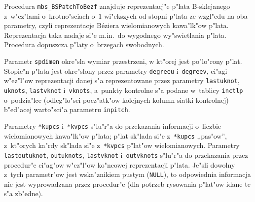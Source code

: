 \vspace{\bigskipamount}
\begin{sloppypar}
Procedura \texttt{mbs\_BSPatchToBezf} znajduje reprezentacj"e
p"lata B-sklejanego z~w"ez\-"la\-mi o~krotno"sciach o~$1$ wi"ekszych od stopni
p"lata ze wzgl"edu na oba parametry, czyli reprezentacje B\'{e}ziera
wielomianowych kawa"lk"ow p"lata. Reprezentacja taka nadaje si"e m.in.\ do
wygodnego wy"swietlania p"lata. Procedura dopuszcza p"laty o~brzegach
swobodnych.
\end{sloppypar}

Parametr \texttt{spdimen} okre"sla wymiar przestrzeni, w kt"orej jest
po"lo"rony p"lat. Stopie"n p"lata jest okre"slony przez parametry
\texttt{degreeu} i~\texttt{degreev}, ci"agi w"ez"l"ow reprezentacji danej
s"a reprezentowane przez parametry \texttt{lastuknot}, \texttt{uknots},
\texttt{lastvknot} i~\texttt{vknots}, a~punkty kontrolne s"a podane
w~tablicy \texttt{inctlp} o~podzia"lce (odleg"lo"sci pocz"atk"ow kolejnych
kolumn siatki kontrolnej) b"ed"acej warto"sci"a parametru \texttt{inpitch}.

Parametry \texttt{*kupcs} i~\texttt{*kvpcs} s"lu"r"a do przekazania
informacji o~liczbie wielomianowych kawa"lk"ow p"lata; p"lat sk"lada si"e
z~\texttt{*kupcs} ,,pas"ow'', z~kt"orych ka"rdy sk"lada si"e
z~\texttt{*kvpcs} p"lat"ow wielomianowych. Parametry \texttt{lastoutuknot},
\texttt{outuknots}, \texttt{lastvknot} i~\texttt{outvknots} s"lu"r"a do
przekazania przez procedur"e ci"ag"ow w"ez"l"ow ko"ncowej reprezentacji
p"lata. Je"sli dowolny z~tych parametr"ow jest wska"znikiem pustym
(\texttt{NULL}), to odpowiednia informacja nie jest wyprowadzana przez
procedur"e (dla potrzeb rysowania p"lat"ow idane te s"a zb"edne).

